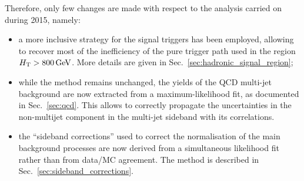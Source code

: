 Therefore, only few changes are made with respect to the analysis carried on during 2015, namely:
\begin{itemize}
\item a more inclusive strategy for the signal triggers has been employed, allowing to recover most of the inefficiency 
of the pure \scalht trigger path used in the region $\mbox{$H_\text{T}$} > 800 \,\mathrm{GeV}$. More details are given in Sec.~\ref{sec:hadronic_signal_region};
\item while the method remains unchanged, the yields of the QCD multi-jet background are now extracted from a maximum-likelihood fit, as documented in Sec.~\ref{sec:qcd}. 
This allows to correctly propagate the uncertainties in the non-multijet component in the multi-jet sideband with its correlations. 
\item the ``sideband corrections'' used to correct the normalisation of the main background processes are now derived from a simultaneous likelihood fit rather than from data/MC agreement. The method is described in Sec.~\ref{sec:sideband_corrections}.
\end{itemize}


